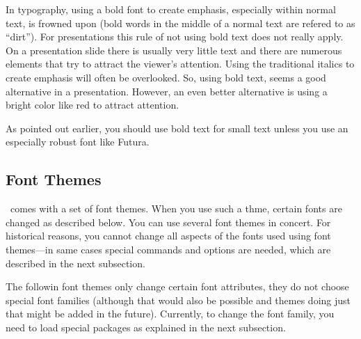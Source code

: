 In typography, using a bold font to create emphasis, especially within
normal text, is frowned upon (bold words in the middle of a normal
text are refered to as ``dirt''). For presentations this rule of not
using bold text does not really apply. On a presentation slide there
is usually very little text and there are numerous elements that try
to attract the viewer's attention. Using the traditional italics to
create emphasis will often be overlooked. So, using bold text, seems a
good alternative in a presentation. However, an even better
alternative is using a bright color like red to attract attention.

As pointed out earlier, you should use bold text for small text
unless you use an especially robust font like Futura.






\subsection{Font Themes}

\beamer\ comes with a set of font themes. When you use such a thme,
certain fonts are changed as described below. You can use several font
themes in concert. For historical reasons, you cannot change all
aspects of the fonts used using font themes---in same cases special
commands and options are needed, which are described in the next
subsection.

The followin font themes only change certain font attributes, they do
not choose special font families (although that would also be possible
and themes doing just that might be added in the future). Currently,
to change the font family, you need to load special packages as
explained in the next subsection.



